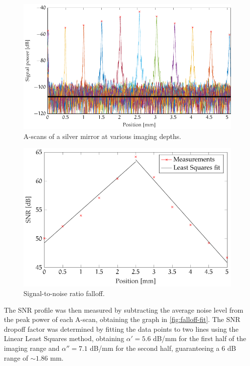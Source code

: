 \begin{figure}[hbt]
	\myfloatalign
	\includegraphics[width=\linewidth]{gfx/tikz/falloff}
	\caption{A-scans of a silver mirror at various imaging depths.}\label{fig:power-falloff}
\end{figure}



\begin{figure}[hbt]
	\myfloatalign
	\includegraphics[width=0.8\linewidth]{gfx/tikz/falloff-fit}
	\caption{Signal-to-noise ratio falloff.}\label{fig:falloff-fit}
\end{figure}




The \acf{SNR} profile was then measured by subtracting the average noise level from the peak power of each A-scan, obtaining the graph in \autoref{fig:falloff-fit}. The SNR dropoff factor was determined by fitting the data points to two lines using the Linear Least Squares method, obtaining $\alpha' = 5.6$ dB/mm for the first half of the imaging range and $ \alpha'' = 7.1$ dB/mm for the second half, guaranteeing a 6 dB range of $\sim 1.86$ mm. 

